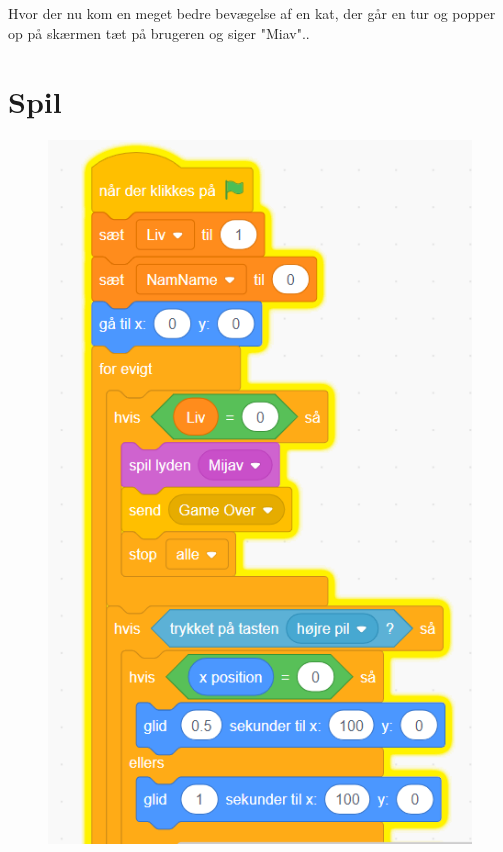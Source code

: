 \documentclass{article}
\begin{document}
Hvor der nu kom en meget bedre bevægelse af en kat, der går en tur og popper op på skærmen tæt på brugeren og siger "Miav"..

\section{Spil}
\begin{figure}[h]
	\includegraphics[scale=0.2]{3billede.png}
\end{figure}
\end{document}
